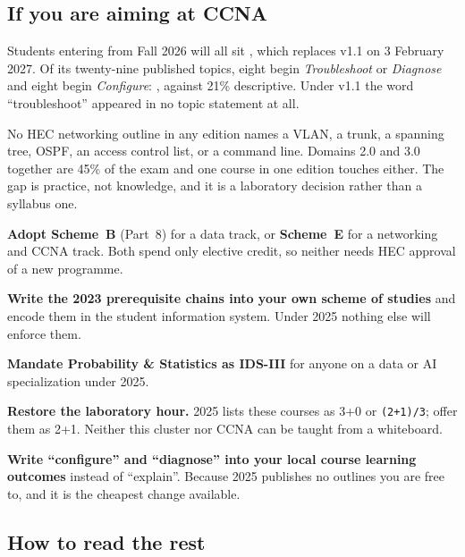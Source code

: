 \documentclass[11pt,a4paper,oneside]{report}
\begin{document}
\subsection*{If you are aiming at CCNA}

Students entering from Fall 2026 will all sit , which
replaces v1.1 on 3 February 2027. Of its twenty-nine published topics, eight
begin \emph{Troubleshoot} or \emph{Diagnose} and eight begin \emph{Configure}:
, against 21\%
descriptive. Under v1.1 the word ``troubleshoot'' appeared in no topic statement
at all.

No HEC networking outline in any edition names a VLAN, a trunk, a spanning tree,
OSPF, an access control list, or a command line. Domains 2.0 and 3.0 together are
45\% of the exam and one course in one edition touches either. The gap is
practice, not knowledge, and it is a laboratory decision rather than a syllabus
one.

\begin{recbox}
\begin{tightnum}
  \item \textbf{Adopt Scheme~B} (Part~8) for a data track, or \textbf{Scheme~E}
        for a networking and CCNA track. Both spend only elective credit, so
        neither needs HEC approval of a new programme.
  \item \textbf{Write the 2023 prerequisite chains into your own scheme of
        studies} and encode them in the student information system. Under 2025
        nothing else will enforce them.
  \item \textbf{Mandate Probability \& Statistics as IDS-III} for anyone on a
        data or AI specialization under 2025.
  \item \textbf{Restore the laboratory hour.} 2025 lists these courses as 3+0 or
        \texttt{(2+1)/3}; offer them as 2+1. Neither this cluster nor CCNA can be
        taught from a whiteboard.
  \item \textbf{Write ``configure'' and ``diagnose'' into your local course
        learning outcomes} instead of ``explain''. Because 2025 publishes no
        outlines you are free to, and it is the cheapest change available.
\end{tightnum}
\end{recbox}

\subsection*{How to read the rest}
\end{document}
